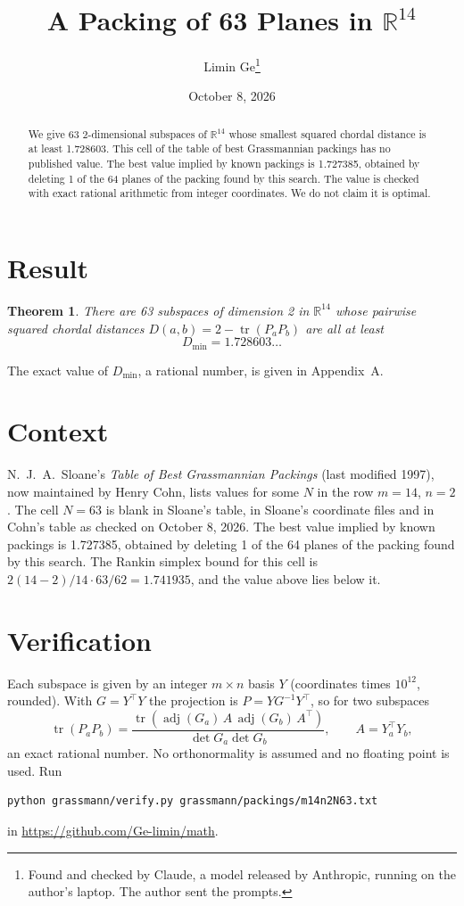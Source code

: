 \documentclass[11pt,a4paper]{article}
\title{A Packing of 63 Planes in $\mathbb{R}^{14}$}
\author{Limin Ge\thanks{Found and checked by Claude, a model released by Anthropic, running on the author's laptop. The author sent the prompts.}}
\date{October 8, 2026}
\newtheorem*{theorem}{Theorem}
\begin{document}
\maketitle
\begin{abstract}
We give 63 2-dimensional subspaces of $\mathbb{R}^{14}$ whose smallest squared chordal distance is at least 1.728603. This cell of the table of best Grassmannian packings has no published value. The best value implied by known packings is 1.727385, obtained by deleting 1 of the 64 planes of the packing found by this search. The value is checked with exact rational arithmetic from integer coordinates. We do not claim it is optimal.
\end{abstract}

\section{Result}
\begin{theorem}
There are 63 subspaces of dimension 2 in $\mathbb{R}^{14}$ whose pairwise squared chordal distances $D(a,b) = 2 - \operatorname{tr}(P_aP_b)$ are all at least
\[ D_{\min} = 1.728603\ldots \]
\end{theorem}
The exact value of $D_{\min}$, a rational number, is given in Appendix~A.


\section{Context}
N.~J.~A.~Sloane's \emph{Table of Best Grassmannian Packings} (last modified 1997), now maintained by Henry Cohn, lists values for some $N$ in the row $m=14$, $n=2$. The cell $N=63$ is blank in Sloane's table, in Sloane's coordinate files and in Cohn's table as checked on October 8, 2026. The best value implied by known packings is 1.727385, obtained by deleting 1 of the 64 planes of the packing found by this search. The Rankin simplex bound for this cell is $2(14-2)/14\cdot 63/62 = 1.741935$, and the value above lies below it.


\section{Verification}
Each subspace is given by an integer $m\times n$ basis $Y$ (coordinates times $10^{12}$, rounded). With $G=Y^\top Y$ the projection is $P=YG^{-1}Y^\top$, so for two subspaces
\[ \operatorname{tr}(P_aP_b)=\frac{\operatorname{tr}(\operatorname{adj}(G_a)\,A\,\operatorname{adj}(G_b)\,A^\top)}{\det G_a\det G_b},\qquad A=Y_a^\top Y_b, \]
an exact rational number. No orthonormality is assumed and no floating point is used. Run
\begin{verbatim}
python grassmann/verify.py grassmann/packings/m14n2N63.txt
\end{verbatim}
in \url{https://github.com/Ge-limin/math}.
\end{document}
